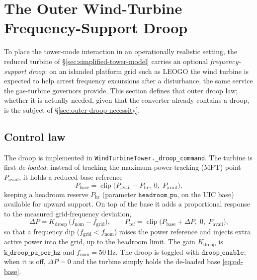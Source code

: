 
\section{The Outer Wind-Turbine Frequency-Support Droop}
\label{sec:outer-droop}

To place the tower-mode interaction in an operationally realistic setting, the
reduced turbine of \S\ref{sec:simplified-tower-model} carries an optional
\emph{frequency-support droop}: on an islanded platform grid such as LEOGO the
wind turbine is expected to help arrest frequency excursions after a disturbance,
the same service the gas-turbine governors provide. This section defines that
outer droop law; whether it is actually needed, given that the converter already
contains a droop, is the subject of \S\ref{sec:outer-droop-necessity}.

\subsection{Control law}
\label{subsec:od-law}

The droop is implemented in \texttt{WindTurbineTower.\_droop\_command}. The
turbine is first \emph{de-loaded}: instead of tracking the maximum-power-tracking
(MPT) point \(P_{\mathrm{avail}}\), it holds a reduced base reference
\begin{equation}
  P_{\mathrm{base}} = \operatorname{clip}\!\big(
    P_{\mathrm{avail}} - P_{\mathrm{hr}},\;0,\;P_{\mathrm{avail}}\big),
  \label{eq:od-base}
\end{equation}
keeping a headroom reserve \(P_{\mathrm{hr}}\) (parameter
\(\texttt{headroom\_pu}\), on the UIC base) available for upward support. On top
of the base it adds a proportional response to the measured grid-frequency
deviation,
\begin{equation}
  \Delta P = K_{\mathrm{droop}}\,\big(f_{\mathrm{nom}} - f_{\mathrm{grid}}\big),
  \qquad
  P_{\mathrm{ref}} = \operatorname{clip}\!\big(
    P_{\mathrm{base}} + \Delta P,\;0,\;P_{\mathrm{avail}}\big),
  \label{eq:od-delta}
\end{equation}
so that a frequency dip (\(f_{\mathrm{grid}} < f_{\mathrm{nom}}\)) raises the
power reference and injects extra active power into the grid, up to the headroom
limit. The gain \(K_{\mathrm{droop}}\) is \(\texttt{k\_droop\_pu\_per\_hz}\) and
\(f_{\mathrm{nom}} = \SI{50}{\hertz}\). The droop is toggled with
\(\texttt{droop\_enable}\); when it is off, \(\Delta P = 0\) and the turbine
simply holds the de-loaded base \eqref{eq:od-base}.

